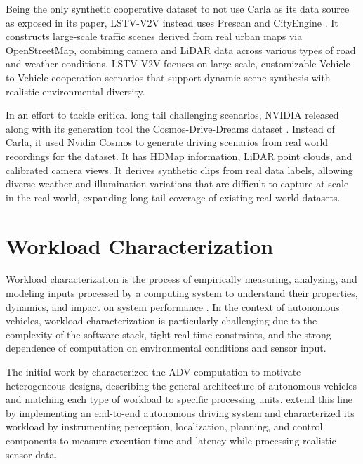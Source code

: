 Being the only synthetic cooperative dataset to not use Carla as its data source as exposed in its paper, LSTV-V2V \cite{Suo2024LSTV-V2V:Perception} instead uses Prescan \cite{prescan2025} and CityEngine \cite{cityengine2025}. It constructs large-scale traffic scenes derived from real urban maps via OpenStreetMap, combining camera and LiDAR data across various types of road and weather conditions. LSTV-V2V focuses on large-scale, customizable Vehicle-to-Vehicle cooperation scenarios that support dynamic scene synthesis with realistic environmental diversity.

In an effort to tackle critical long tail challenging scenarios, NVIDIA released along with its generation tool the Cosmos-Drive-Dreams dataset \cite{Ren2025Cosmos-Drive-Dreams:Models}. Instead of Carla, it used Nvidia Cosmos \cite{nvidia_cosmos} to generate driving scenarios from real world recordings for the dataset. It has HDMap information, LiDAR point clouds, and calibrated camera views. It derives synthetic clips from real data labels, allowing diverse weather and illumination variations that are difficult to capture at scale in the real world, expanding long-tail coverage of existing real-world datasets.



\section{Workload Characterization}

Workload characterization is the process of empirically measuring, analyzing, and modeling inputs processed by a computing system to understand their properties, dynamics, and impact on system performance \cite{Calzarossa2016WorkloadRevisited}. In the context of autonomous vehicles, workload characterization is particularly challenging due to the complexity of the software stack, tight real-time constraints, and the strong dependence of computation on environmental conditions and sensor input.

The initial work by  characterized the ADV computation to motivate heterogeneous designs, describing the general architecture of autonomous vehicles and matching each type of workload to specific processing units. %
 extend this line by implementing an end-to-end autonomous driving system and characterized its workload by instrumenting perception, localization, planning, and control components to measure execution time and latency while processing realistic sensor data.

